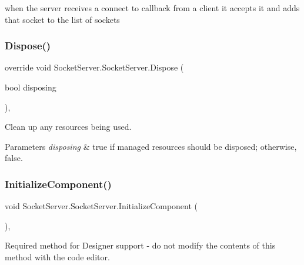 when the server receives a connect to callback from a client it accepts it and adds that socket to the list of sockets \mbox{\label{class_socket_server_1_1_socket_server_a577f703fecf496140d420e0049159905}} 
\subsubsection{\texorpdfstring{Dispose()}{Dispose()}}
{\footnotesize\ttfamily override void Socket\+Server.\+Socket\+Server.\+Dispose (\begin{DoxyParamCaption}\item[{bool}]{disposing }\end{DoxyParamCaption})\hspace{0.3cm}{\ttfamily [inline]}, {\ttfamily [protected]}}



Clean up any resources being used. 


\begin{DoxyParams}{Parameters}
{\em disposing} & true if managed resources should be disposed; otherwise, false.\\
\hline
\end{DoxyParams}
\mbox{\label{class_socket_server_1_1_socket_server_a19cb5f0314ec00e0837a893f079bf78d}} 
\subsubsection{\texorpdfstring{Initialize\+Component()}{InitializeComponent()}}
{\footnotesize\ttfamily void Socket\+Server.\+Socket\+Server.\+Initialize\+Component (\begin{DoxyParamCaption}{ }\end{DoxyParamCaption})\hspace{0.3cm}{\ttfamily [inline]}, {\ttfamily [private]}}



Required method for Designer support -\/ do not modify the contents of this method with the code editor. 

